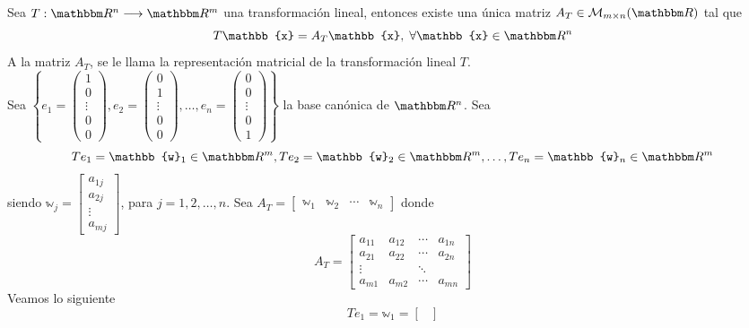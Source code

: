 \begin{theorem}\label{matrix_representationtl}
    Sea $T: \RR[n] \longrightarrow \RR[m]$ una transformación lineal, entonces existe una única matriz $A_T \in \matrizmn$ tal que
    $$T\mathbb{x} = A_T\mathbb{x}, \; \forall \mathbb{x} \in \RR[n]$$
    A la matriz $A_T$, se le llama la representación matricial de la transformación lineal $T$. \\
    \demostracion Sea $\displaystyle \left\{ e_1 = \left( \begin{array}{c} 1 \\ 0 \\ \vdots \\ 0 \\ 0 \end{array} \right),  e_2 = \left( \begin{array}{c} 0 \\ 1 \\ \vdots \\ 0 \\ 0 \end{array} \right),  \dots,  e_n = \left( \begin{array}{c} 0 \\ 0 \\ \vdots \\ 0 \\ 1 \end{array} \right) \right\}$ la base canónica de $\RR[n]$. Sea
    $$Te_1 = \mathbb{w}_1 \in \RR[m],  Te_2 = \mathbb{w}_2 \in \RR[m],  \dots,  Te_n = \mathbb{w}_n \in \RR[m]$$
    siendo $\mathbb{w}_j = \begin{bmatrix}
        a_{1j} \\
        a_{2j} \\
        \vdots \\
        a_{mj}
    \end{bmatrix}$, para $j = 1,  2,  \dots,  n$. Sea $A_T = \begin{bmatrix}
        \mathbb{w}_1 & \mathbb{w}_2 & \cdots & \mathbb{w}_n
    \end{bmatrix}$ donde
    $$A_T = \begin{bmatrix}
        a_{11} & a_{12} & \cdots & a_{1n} \\
        a_{21} & a_{22} & \cdots & a_{2n} \\
        \vdots & & \ddots & \\
        a_{m1} & a_{m2} & \cdots & a_{mn}
    \end{bmatrix}$$\newpage\noindent
    Veamos lo siguiente
    $$Te_1 = \mathbb{w}_1 = \begin{bmatrix}

\end{bmatrix}$$
\end{theorem}
